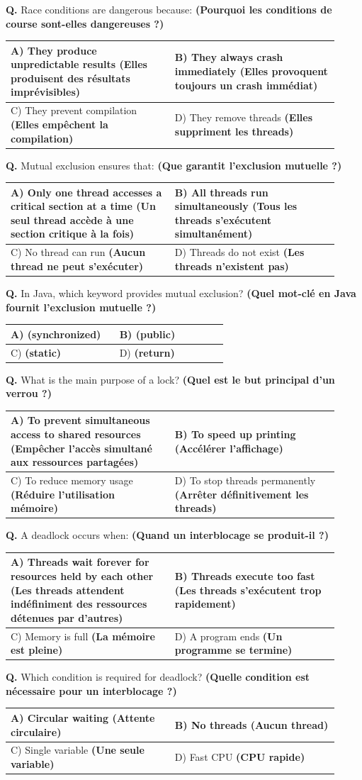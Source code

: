 \documentclass[11pt,a4paper]{article}
\newcounter{qnum}
\newcommand{\Q}{%
	\stepcounter{qnum}%
	\noindent\textbf{Q\theqnum. }%
}
\DeclareRobustCommand{\code}[1]{\texttt{\detokenize{#1}}}
\newcommand{\choices}[4]{%
	\setlength{\tabcolsep}{4pt}%
	\renewcommand{\arraystretch}{1.15}%
	\begin{tabular}{|p{0.46\linewidth}|p{0.46\linewidth}|}
		\hline
		A) #1 & B) #2 \\ \hline
		C) #3 & D) #4 \\ \hline
	\end{tabular}%
}
\begin{document}
	\Q Race conditions are dangerous because: \textbf{(Pourquoi les conditions de course sont-elles dangereuses ?) }
	
	\choices
	{They produce unpredictable results \textbf{(Elles produisent des résultats imprévisibles)}}
	{They always crash immediately \textbf{(Elles provoquent toujours un crash immédiat)}}
	{They prevent compilation \textbf{(Elles empêchent la compilation)}}
	{They remove threads \textbf{(Elles suppriment les threads)}}
	
	\Q Mutual exclusion ensures that: \textbf{(Que garantit l’exclusion mutuelle ?) }
	
	\choices
	{Only one thread accesses a critical section at a time \textbf{(Un seul thread accède à une section critique à la fois)}}
	{All threads run simultaneously \textbf{(Tous les threads s’exécutent simultanément)}}
	{No thread can run \textbf{(Aucun thread ne peut s’exécuter)}}
	{Threads do not exist \textbf{(Les threads n’existent pas)}}
	
	\Q In Java, which keyword provides mutual exclusion? \textbf{(Quel mot-clé en Java fournit l’exclusion mutuelle ?) }
	
	\choices
	{\code{synchronized} \textbf{(synchronized)}}
	{\code{public} \textbf{(public)}}
	{\code{static} \textbf{(static)}}
	{\code{return} \textbf{(return)}}
	
\Q What is the main purpose of a lock? \textbf{(Quel est le but principal d’un verrou ?) }

\choices
{To prevent simultaneous access to shared resources \textbf{(Empêcher l’accès simultané aux ressources partagées)}}
{To speed up printing \textbf{(Accélérer l’affichage)}}
{To reduce memory usage \textbf{(Réduire l’utilisation mémoire)}}
{To stop threads permanently \textbf{(Arrêter définitivement les threads)}}

\Q A deadlock occurs when: \textbf{(Quand un interblocage se produit-il ?) }

\choices
{Threads wait forever for resources held by each other \textbf{(Les threads attendent indéfiniment des ressources détenues par d’autres)}}
{Threads execute too fast \textbf{(Les threads s’exécutent trop rapidement)}}
{Memory is full \textbf{(La mémoire est pleine)}}
{A program ends \textbf{(Un programme se termine)}}

\Q Which condition is required for deadlock? \textbf{(Quelle condition est nécessaire pour un interblocage ?) }

\choices
{Circular waiting \textbf{(Attente circulaire)}}
{No threads \textbf{(Aucun thread)}}
{Single variable \textbf{(Une seule variable)}}
{Fast CPU \textbf{(CPU rapide)}}
\end{document}
